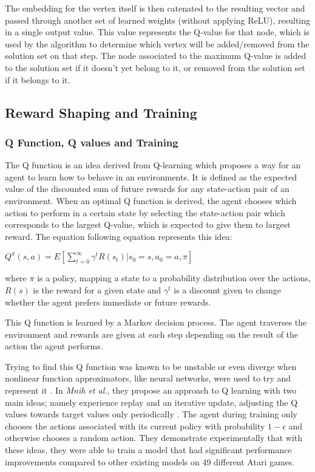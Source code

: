\documentclass{article}
\begin{document}
The embedding for the vertex itself is then catenated to the resulting vector and passed through another set of learned weights (without applying ReLU), resulting in a single output value. This value represents the Q-value for that node, which is used by the algorithm to determine which vertex will be added/removed from the solution set on that step. The node associated to the maximum Q-value is added to the solution set if it doesn't yet belong to it, or removed from the solution set if it belongs to it.

\subsection{Reward Shaping and Training}

\subsubsection{Q Function, Q values and Training}

The Q function is an idea derived from Q-learning \cite{qlearning} which proposes a way for an agent to learn how to behave in an environments. It is defined as the expected value of the discounted sum of future rewards for any state-action pair of an environment. When an optimal Q function is derived, the agent chooses which action to perform in a certain state by selecting the state-action pair which corresponds to the largest Q-value, which is expected to give them to largest reward. The equation following equation represents this idea:
 
$Q^\pi(s, a) = E[\sum_{t=0}^{\infty} \gamma^t R(s_t) | s_0 = s, a_0 = a, \pi]$

where $\pi$ is a policy, mapping a state to a probability distribution over the actions, $R(s)$ is the reward for a given state and $\gamma^t$ is a discount given to change whether the agent prefers immediate or future rewards.

This Q function is learned by a Markov decision process. The agent traverses the environment and rewards are given at each step depending on the result of the action the agent performs.

Trying to find this Q function was known to be unstable or even diverge when nonlinear function approximators, like neural networks, were used to try and represent it \cite{td-func-approx}. In \textit{Mnih et al.}, they propose an approach to Q learning with two main ideas; namely experience replay and an iterative update, adjusting the Q values towards target values only periodically \cite{deepmind_2015}. The agent during training only chooses the actions associated with its current policy with probability $1 - \epsilon$ and otherwise chooses a random action. They demonstrate experimentally that with these ideas, they were able to train a model that had significant performance improvements compared to other existing models on 49 different Atari games.
\end{document}
